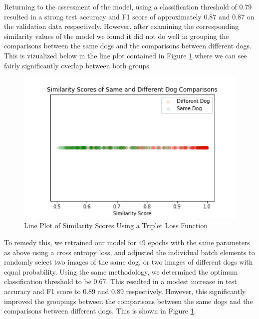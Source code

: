 \documentclass{article}
\begin{document}
\begin{enumerate}
Returning to the assessment of the model, using a classification threshold of 0.79 resulted in a strong test accuracy and F1 score of approximately 0.87 and 0.87 on the validation data respectively.  However, after examining the corresponding similarity values of the model we found it did not do well in grouping the comparisons between the same dogs and the comparisons between different dogs.  This is vizualized below in the line plot contained in Figure \ref{fig:x triplet lineplot} where we can see fairly significantly overlap between both groups.

\begin{figure}[h]
\centering
	\includegraphics[scale=0.7]{final-report-images/triplet_lineplot.png}
\caption{Line Plot of Similarity Scores Using a Triplet Loss Function}
\label{fig:x triplet lineplot}
\end{figure}
\noindent To remedy this, we retrained our model for 49 epochs with the same parameters as above using a cross entropy loss, and adjusted the individual batch elements to randomly select two images of the same dog, or two images of different dogs with equal probability.  Using the same methodology, we determined the optimum classification threshold to be 0.67.  This resulted in a modest increase in test accuracy and F1 score to 0.89 and 0.89 respectively.  However, this significantly improved the groupings between the comparisons between the same dogs and the comparisons between different dogs. This is shown in Figure \ref{fig:x triplet lineplot}. 


\end{enumerate}
\end{document}
